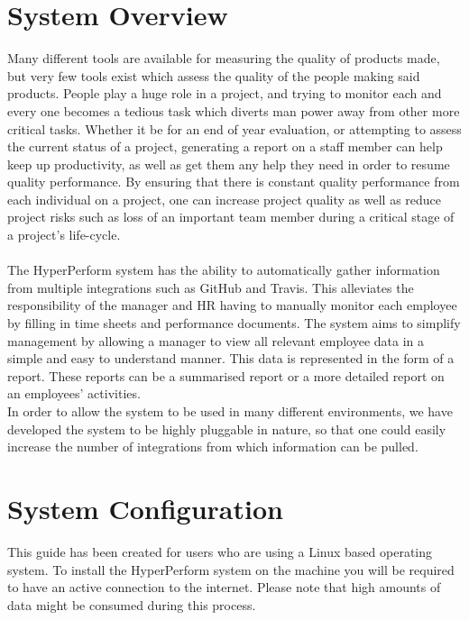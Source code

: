 \documentclass[11pt,a4paper]{article}
\begin{document}
	\thispagestyle{empty}
	\pagebreak
	
	\tableofcontents
	\pagebreak

\section{System Overview}
Many different tools are available for measuring the quality of products made, but very few tools exist which assess the quality of the people making said products. People play a huge role in a project, and trying to monitor each and every one becomes a tedious task which diverts man power away from other more critical tasks. Whether it be for an end of year evaluation, or attempting to assess the current status of a project, generating a report on a staff member can help keep up productivity, as well as get them any help they need in order to resume quality performance. By ensuring that there is constant quality performance from each individual on a project, one can increase project quality as well as reduce project risks such as loss of an important team member during a critical stage of a project's life-cycle. \\ \\
The HyperPerform system has the ability to automatically gather information from multiple integrations such as GitHub and Travis. This alleviates the responsibility of the manager and HR having to manually monitor each employee by filling in time sheets and performance documents. The system aims to simplify management by allowing a manager to view all relevant employee data in a simple and easy to understand manner. This data is represented in the form of a report. These reports can be a summarised report or a more detailed report on an employees' activities. \\
In order to allow the system to be used in many different environments, we have developed the system to be highly pluggable in nature, so that one could easily increase the number of integrations from which information can be pulled.

\section{System Configuration}
This guide has been created for users who are using a Linux based operating system. To install the HyperPerform system on the machine you will be required to have an active connection to the internet. Please note that high amounts of data might be consumed during this process. 
\end{document}
